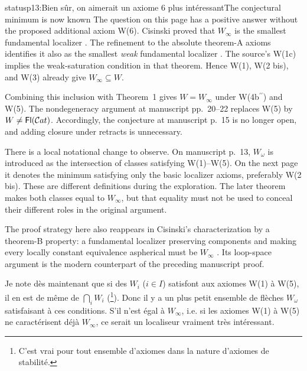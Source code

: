 \begin{dcomment}{status}{p13:Bien sûr, on aimerait un axiome 6 plus intéressant}{The conjectural minimum is now known}
The question on this page has a positive answer without the proposed additional axiom W(6). Cisinski proved that \(W_\infty\) is the smallest fundamental localizer \citep[Theorem~2.2.11]{Cisinski2004Minimal}. The refinement to the absolute theorem-A axioms identifies it also as the smallest \emph{weak} fundamental localizer \citep[Theorem~6.1.18]{Cisinski2006}. The source's W(1c) implies the weak-saturation condition in that theorem. Hence W(1), W(2 bis), and W(3) already give \(W_\infty\subseteq W\).

Combining this inclusion with Theorem~1 gives \(W=W_\infty\) under W(4b\(^{\prime\prime}\)) and W(5). The nondegeneracy argument at manuscript pp.~20--22 replaces W(5) by \(W\ne\mathsf{Fl}(\mathcal{C}at)\). Accordingly, the conjecture at manuscript p.~15 is no longer open, and adding closure under retracts is unnecessary.

There is a local notational change to observe. On manuscript p.~13, \(W_\omega\) is introduced as the intersection of classes satisfying W(1)--W(5). On the next page it denotes the minimum satisfying only the basic localizer axioms, preferably W(2 bis). These are different definitions during the exploration. The later theorem makes both classes equal to \(W_\infty\), but that equality must not be used to conceal their different roles in the original argument.

The proof strategy here also reappears in Cisinski's characterization by a theorem-B property: a fundamental localizer preserving components and making every locally constant equivalence aspherical must be \(W_\infty\) \citep[Theorem~2.3.6]{Cisinski2004Minimal}. Its loop-space argument is the modern counterpart of the preceding manuscript proof.
\end{dcomment}



Je note dès maintenant que si des $W_i$ ($i \in I$) satisfont aux axiomes W(1) à W(5), il en est de même de $\bigcap_i W_i$ (\footnote[30]{C'est vrai pour tout ensemble d'axiomes dans la nature d'axiomes de stabilité.}). Donc il y a un plus petit ensemble de flèches $W_\omega$ satisfaisant à ces conditions. S'il n'est égal à $W_\infty$, i.e. si les axiomes W(1) à W(5) ne caractérisent déjà $W_\infty$, ce serait un localiseur vraiment très intéressant.

